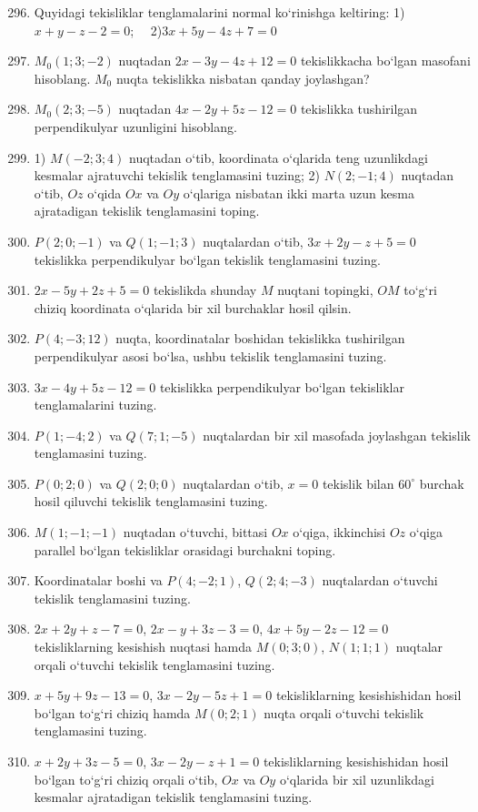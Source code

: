 \begin{enumerate}\setcounter{enumi}{295}
	\item Quyidagi tekisliklar tenglamalarini normal ko`rinishga keltiring:
	1)$x+y-z-2=0$; \ \ 2)$3x+5y-4z+7=0$
	\item $M_0(1;3;-2)$ nuqtadan $2x-3y-4z+12=0$ tekislikkacha bo`lgan masofani hisoblang. $M_0$ nuqta tekislikka nisbatan qanday joylashgan?
	\item $M_0(2;3;-5)$ nuqtadan $4x-2y+5z-12=0$ tekislikka tushirilgan perpendikulyar uzunligini hisoblang.
	\item 1) $M(-2;3;4)$ nuqtadan o`tib, koordinata o`qlarida teng uzunlikdagi kesmalar ajratuvchi tekislik tenglamasini tuzing;
	2) $N(2;-1;4)$ nuqtadan o`tib, $Oz$ o`qida $Ox$ va $Oy$ o`qlariga nisbatan ikki marta uzun kesma ajratadigan tekislik tenglamasini toping.
	\item $P(2;0;-1)$ va $Q(1;-1;3)$ nuqtalardan o`tib, $3x+2y-z+5=0$ tekislikka perpendikulyar bo`lgan tekislik tenglamasini tuzing. 
	\item $2x-5y+2z+5=0$ tekislikda shunday $M$ nuqtani topingki, $OM$ to`g`ri chiziq koordinata o`qlarida bir xil burchaklar hosil qilsin.
	\item $P(4;-3;12)$ nuqta, koordinatalar boshidan tekislikka tushirilgan perpendikulyar asosi bo`lsa, ushbu tekislik tenglamasini tuzing.
	\item $3x-4y+5z-12=0$ tekislikka perpendikulyar bo`lgan tekisliklar tenglamalarini tuzing.
	\item $P(1;-4;2)$ va $Q(7;1;-5)$ nuqtalardan bir xil masofada joylashgan tekislik tenglamasini tuzing.
	\item $P(0;2;0)$ va $Q(2;0;0)$ nuqtalardan o`tib, $x=0$ tekislik bilan $60^\circ$ burchak hosil qiluvchi tekislik tenglamasini tuzing.
	\item $M(1;-1;-1)$ nuqtadan o`tuvchi, bittasi $Ox$ o`qiga, ikkinchisi $Oz$ o`qiga parallel bo`lgan tekisliklar orasidagi burchakni toping.
	\item Koordinatalar boshi va $P(4;-2;1)$, $Q(2;4;-3)$ nuqtalardan o`tuvchi tekislik tenglamasini tuzing.
	\item $2x+2y+z-7=0$, $2x-y+3z-3=0$, $4x+5y-2z-12=0$ tekisliklarning kesishish nuqtasi hamda $M(0;3;0)$, $N(1;1;1)$ nuqtalar orqali o`tuvchi tekislik tenglamasini tuzing.
	\item $x+5y+9z-13=0$, $3x-2y-5z+1=0$ tekisliklarning kesishishidan hosil bo`lgan to`g`ri chiziq hamda $M(0;2;1)$ nuqta orqali o`tuvchi tekislik tenglamasini tuzing.
	\item $x+2y+3z-5=0$, $3x-2y-z+1=0$ tekisliklarning kesishishidan hosil bo`lgan to`g`ri chiziq orqali o`tib, $Ox$ va $Oy$ o`qlarida bir xil uzunlikdagi kesmalar ajratadigan tekislik tenglamasini tuzing.

\end{enumerate}
